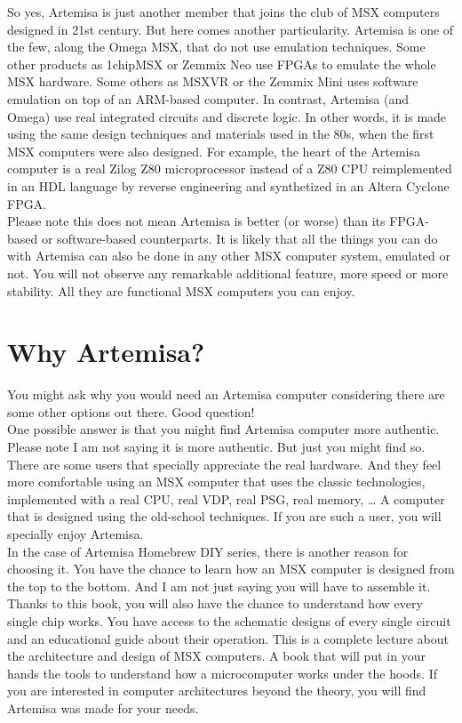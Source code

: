 So yes, Artemisa is just another member that joins the club of MSX computers designed in 21st century. But here comes another particularity. Artemisa is one of the few, along the Omega MSX, that do not use emulation techniques. Some other products as 1chipMSX or Zemmix Neo use FPGAs to emulate the whole MSX hardware. Some others as MSXVR or the Zemmix Mini uses software emulation on top of an ARM-based computer. In contrast, Artemisa (and Omega) use real integrated circuits and discrete logic. In other words, it is made using the same design techniques and materials used in the 80s, when the first MSX computers were also designed. For example, the heart of the Artemisa computer is a real Zilog Z80 microprocessor instead of a Z80 CPU reimplemented in an HDL language by reverse engineering and synthetized in an Altera Cyclone FPGA. \\

Please note this does not mean Artemisa is better (or worse) than its FPGA-based or software-based counterparts. It is likely that all the things you can do with Artemisa can also be done in any other MSX computer system, emulated or not. You will not observe any remarkable additional feature, more speed or more stability. All they are functional MSX computers you can enjoy. \\

\section{Why Artemisa?}

You might ask why you would need an Artemisa computer considering there are some other options out there. Good question! \\

One possible answer is that you might find Artemisa computer more authentic. Please note I am not saying it is more authentic. But just you might find so. There are some users that specially appreciate the real hardware. And they feel more comfortable using an MSX computer that uses the classic technologies, implemented with a real CPU, real VDP, real PSG, real memory, … A computer that is designed using the old-school techniques. If you are such a user, you will specially enjoy Artemisa. \\

In the case of Artemisa Homebrew DIY series, there is another reason for choosing it. You have the chance to learn how an MSX computer is designed from the top to the bottom. And I am not just saying you will have to assemble it. Thanks to this book, you will also have the chance to understand how every single chip works. You have access to the schematic designs of every single circuit and an educational guide about their operation. This is a complete lecture about the architecture and design of MSX computers. A book that will put in your hands the tools to understand how a microcomputer works under the hoods. If you are interested in computer architectures beyond the theory, you will find Artemisa was made for your needs. \\

